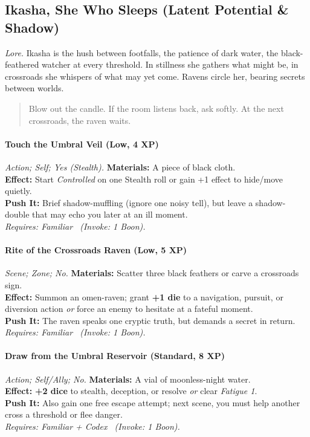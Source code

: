 \subsection{Ikasha, She Who Sleeps (Latent Potential \& Shadow)}
\textit{Lore.} Ikasha is the hush between footfalls, the patience of dark water, the black-feathered watcher at every threshold. In stillness she gathers what might be, in crossroads she whispers of what may yet come. Ravens circle her, bearing secrets between worlds.

\begin{quote}
Blow out the candle. If the room listens back, ask softly. At the next crossroads, the raven waits.
\end{quote}

\paragraph{Touch the Umbral Veil (Low, 4 XP)} \emph{Action; Self; Yes (Stealth).}
\textbf{Materials:} A piece of black cloth.\\
\textbf{Effect:} Start \emph{Controlled} on one Stealth roll or gain +1 effect to hide/move quietly.\\
\textbf{Push It:} Brief shadow-muffling (ignore one noisy tell), but leave a shadow-double that may echo you later at an ill moment.\\
\emph{Requires: Familiar \ (\textit{Invoke:} 1 Boon).}

\paragraph{Rite of the Crossroads Raven (Low, 5 XP)} \emph{Scene; Zone; No.}
\textbf{Materials:} Scatter three black feathers or carve a crossroads sign.\\
\textbf{Effect:} Summon an omen-raven; grant \textbf{+1 die} to a navigation, pursuit, or diversion action \emph{or} force an enemy to hesitate at a fateful moment.\\
\textbf{Push It:} The raven speaks one cryptic truth, but demands a secret in return.\\
\emph{Requires: Familiar \ (\textit{Invoke:} 1 Boon).}

\paragraph{Draw from the Umbral Reservoir (Standard, 8 XP)} \emph{Action; Self/Ally; No.}
\textbf{Materials:} A vial of moonless-night water.\\
\textbf{Effect:} \textbf{+2 dice} to stealth, deception, or resolve \emph{or} clear \emph{Fatigue 1}.\\
\textbf{Push It:} Also gain one free escape attempt; next scene, you must help another cross a threshold or flee danger.\\
\emph{Requires: Familiar + Codex \ (\textit{Invoke:} 1 Boon).}

